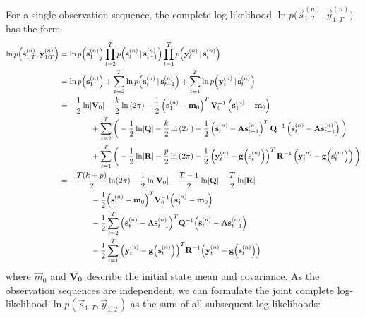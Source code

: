 For a single observation sequence, the complete log-likelihood \( \ln p\Big(\vec{s}_{1:T}^{(n)}, \vec{y}_{1:T}^{(n)}\Big) \) has the form
\begin{align*}
	\ln p\Big(\vec{s}_{1:T}^{(n)}, \vec{y}_{1:T}^{(n)}\Big)
		&= \ln p\Big(\vec{s}_1^{(n)}\Big) \prod_{t = 2}^{T} p\Big(\vec{s}_t^{(n)} \given \vec{s}_{t - 1}^{(n)}\Big) \prod_{t = 1}^{T} p\Big(\vec{y}_t^{(n)} \given \vec{s}_t^{(n)}\Big) \\
		&= \ln p\Big(\vec{s}_1^{(n)}\Big) + \sum_{t = 2}^{T} \ln p\Big(\vec{s}_t^{(n)} \given \vec{s}_{t - 1}^{(n)}\Big) + \sum_{t = 1}^{T} \ln p\Big(\vec{y}_t^{(n)} \given \vec{s}_t^{(n)}\Big) \\
		&= \logGaussianMulti{\vec{s}_1^{(n)}}{\vec{m}_0}{\mat{V}_0}{k} \\
			&\qquad\qquad + \sum_{t = 2}^{T} \bigg( \logGaussianMulti{\vec{s}_t^{(n)}}{\mat{A} \vec{s}_{t - 1}^{(n)}}{\mat{Q}}{k} \bigg) \\
			&\qquad\qquad + \sum_{t = 1}^{T} \bigg( \logGaussianMulti{\vec{y}_t^{(n)}}{\vec{g}\Big(\vec{s}_t^{(n)}\Big)}{\mat{R}}{p} \bigg) \\
		&= -\frac{T(k + p)}{2} \ln(2\pi) - \frac{1}{2} \ln \lvert \mat{V}_0 \rvert - \frac{T - 1}{2} \ln \lvert \mat{Q} \rvert - \frac{T}{2} \ln \lvert \mat{R} \rvert \\
			&\qquad\qquad -\frac{1}{2} \Big( \vec{s}_1^{(n)} - \vec{m}_0 \Big)^T \mat{V}_0^{-1} \Big( \vec{s}_1^{(n)} - \vec{m}_0 \Big) \\
			&\qquad\qquad -\frac{1}{2} \sum_{t = 2}^{T} \Big( \vec{s}_t^{(n)} - \mat{A} \vec{s}_{t - 1}^{(n)} \Big)^T \mat{Q}^{-1} \Big( \vec{s}_t^{(n)} - \mat{A} \vec{s}_{t - 1}^{(n)} \Big) \\
			&\qquad\qquad -\frac{1}{2} \sum_{t = 1}^{T} \Big( \vec{y}_t^{(n)} - \vec{g}\Big(\vec{s}_t^{(n)}\Big) \Big)^T \mat{R}^{-1} \Big( \vec{y}_t^{(n)} - \vec{g}\Big(\vec{s}_t^{(n)}\Big) \Big)
\end{align*}
where \( \vec{m}_0 \) and \( \mat{V}_0 \) describe the initial state mean and covariance. As the observation sequences are independent, we can formulate the joint complete log-likelihood \( \ln p(\vec{s}_{1:T}, \vec{y}_{1:T}) \) as the sum of all subsequent log-likelihoods:
